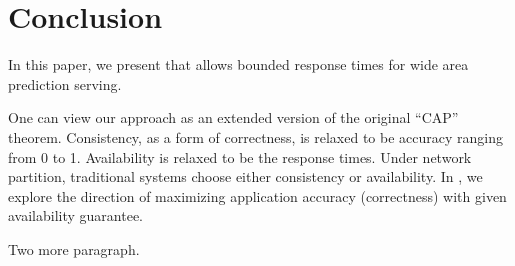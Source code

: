 \section{Conclusion}
\label{sec:conclusion}

In this paper, we present \sysname{} that allows bounded response times for wide
area prediction serving.

One can view our approach as an extended version of the original ``CAP''
theorem. Consistency, as a form of correctness, is relaxed to be accuracy
ranging from 0 to 1. Availability is relaxed to be the response times. Under
network partition, traditional systems choose either consistency or
availability. In \sysname{}, we explore the direction of maximizing application
accuracy (correctness) with given availability guarantee.

Two more paragraph.

